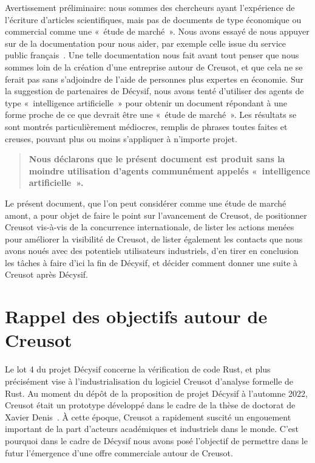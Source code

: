\documentclass[a4paper,11pt]{article}
\begin{document}
Avertissement préliminaire: nous sommes des chercheurs ayant l'expérience de
l'écriture d'articles scientifiques, mais pas de documents de type économique ou
commercial comme une «~étude de marché~». Nous avons essayé de nous appuyer sur
de la documentation pour nous aider, par exemple celle issue du service public
français~\cite{etudedemarche}. Une telle documentation nous fait avant tout
penser que nous sommes loin de la création d'une entreprise autour de Creusot,
et que cela ne se ferait pas sans s'adjoindre de l'aide de personnes plus
expertes en économie. Sur la suggestion de partenaires de Décysif, nous avons
tenté d'utiliser des agents de type «~intelligence artificielle~» pour obtenir
un document répondant à une forme proche de ce que devrait être une «~étude de
marché~». Les résultats se sont montrés particulièrement médiocres, remplis de
phrases toutes faites et creuses, pouvant plus ou moins s'appliquer à n'importe
projet.

\begin{quote}\bfseries
Nous déclarons que le présent document est produit sans la moindre
utilisation d'agents communément appelés «~intelligence artificielle~».
\end{quote}

Le présent document, que l'on peut considérer comme une étude de marché amont, a
pour objet de faire le point sur l'avancement de Creusot, de positionner Creusot
vis-à-vis de la concurrence internationale, de lister les actions menées pour
améliorer la visibilité de Creusot, de lister également les contacts que nous
avons noués avec des potentiels utilisateurs industriels, d'en tirer en
conclusion les tâches à faire d'ici la fin de Décysif, et décider comment donner
une suite à Creusot après Décysif.

\section{Rappel des objectifs autour de Creusot}
\label{sec:objectifs}

Le lot 4 du projet Décysif concerne la vérification de code Rust, et plus
précisément vise à l'industrialisation du logiciel Creusot d’analyse formelle de
Rust. Au moment du dépôt de la proposition de projet Décysif à l'automne 2022,
Creusot était un prototype développé dans le cadre de la thèse de doctorat de
Xavier Denis~\cite{denis23phd}. À cette époque, Creusot a rapidement suscité un
engouement important de la part d’acteurs académiques et industriels dans le
monde. C'est pourquoi dans le cadre de Décysif nous avons posé l’objectif de
permettre dans le futur l’émergence d’une offre commerciale autour de Creusot.
\end{document}

